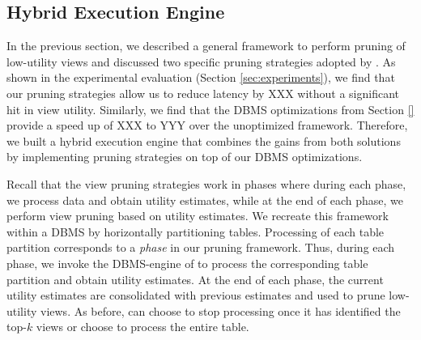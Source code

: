 \subsection{Hybrid Execution Engine}
\label{sec:hybrid_exectution_engine}
In the previous section, we described a general framework to perform pruning of low-utility views and discussed two specific pruning strategies adopted by \SeeDB.
As shown in the experimental evaluation (Section \ref{sec:experiments}), we find that
our pruning strategies allow us to reduce latency by XXX without a significant hit in view utility.
Similarly, we find that the DBMS optimizations from Section \ref{} provide a speed up of XXX to YYY over the unoptimized framework. 
Therefore, we built a hybrid execution engine that combines the gains from both solutions by implementing pruning strategies on top of our DBMS optimizations. 


Recall that the view pruning strategies work in phases where during each phase, we process data and obtain utility estimates, while at the end of each phase, we perform view pruning based on utility estimates.
We recreate this framework within a DBMS by horizontally partitioning tables.
Processing of each table partition corresponds to a {\it phase} in our pruning framework. 
Thus, during each phase, we invoke the DBMS-engine of \SeeDB to process the corresponding table partition and obtain utility estimates.
At the end of each phase, the current utility estimates are consolidated with previous estimates and used to prune low-utility views.
As before, \SeeDB can choose to stop processing once it has identified the top-$k$ views or choose to process the entire table.


